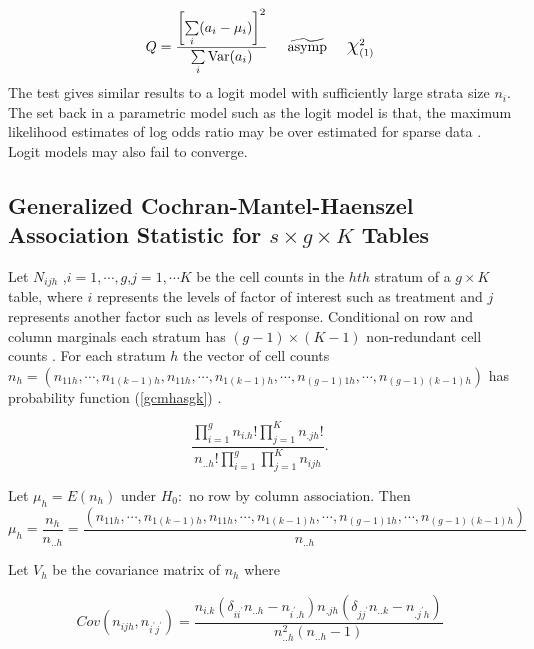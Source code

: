 \documentclass[12pt,oneside]{report}
\theoremstyle{definition}
\theoremstyle{mystyle}
\begin{document}
\begin{equation}
Q=\frac{\left[\sum\limits_{i} (a_{i}-\mu_{i})\right]^{2}}{\sum\limits_{i} \text{Var}{(a_{i}})}\hspace{5mm}\widetilde{\text{asymp}} \hspace{5mm} \mbox{\Large$\chi$}_{(1)}^{2}
\end{equation}
\vspace{5mm}
The test gives similar results to a logit model with sufficiently large strata size $n_{i}$. The set back in a parametric model such as  the logit model is that, the maximum likelihood estimates of log odds ratio may be  over estimated for sparse data \cite{Agresti2013}. Logit models may also fail to converge.


\subsection{Generalized Cochran-Mantel-Haenszel Association  Statistic for $s\times g\times K$ Tables}
Let $N_{ijh}$ ,$i=1,\cdots,g$,$j=1,\cdots K$ be the cell counts in the $hth$ stratum of a $g\times K$ table, where $i$ represents the levels of factor of interest such as treatment and $j$ represents another factor such as levels of response. Conditional on row and column marginals each stratum has $(g-1)\times(K-1)$ non-redundant cell counts \cite{Agresti2013}.
For each stratum $h$ the vector of cell counts $n_{h}=(n_{11h},\cdots,n_{1(k-1)h},n_{11h},\cdots,n_{1(k-1)h},\cdots,n_{(g-1)1h},\cdots,n_{(g-1)(k-1)h})$ has probability function  (\ref{gcmhasgk}) .

\begin{equation}\label{gcmhasgk}
\displaystyle\frac{\prod \limits_{i=1}^{g}n_{i.h}!\prod \limits_{j=1}^{K}n_{.jh}!}{n_{..h}!\prod \limits_{i=1}^{g}\prod \limits_{j=1}^{K}n_{ijh}}.
\end{equation}

Let $\mu_{h}=E(n_{h})$ under $H_{0}:$ no row by column association. Then\\
\begin{equation}
\mu_{h}=\frac{n_{h}}{n_{..h}}=\frac{(n_{11h},\cdots,n_{1(k-1)h},n_{11h},\cdots,n_{1(k-1)h},\cdots,n_{(g-1)1h},\cdots,n_{(g-1)(k-1)h})}{n_{..h}}
\end{equation}

Let $V_{h}$ be the covariance matrix of $n_{h}$ where 

\begin{equation}
Cov(n_{ijh},n_{i^{\prime}j^{\prime}})=\frac{n_{i.k}(\delta_{ii^{\prime}}n_{..h}-n_{i^{\prime}.h})n_{.jh}(\delta_{jj^{\prime}}n_{..k}-n_{.j^{\prime}h})}{n_{..h}^{2}(n_{..h}-1)}
\end{equation}
\end{document}
